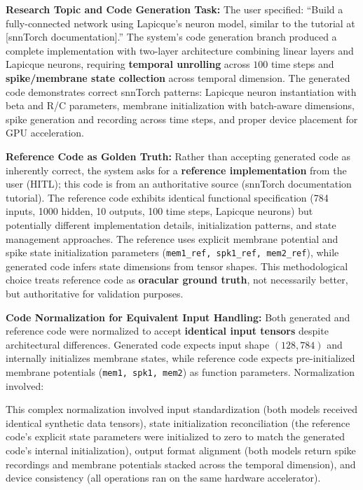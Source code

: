 \vspace{0.3cm}

\noindent \textbf{Research Topic and Code Generation Task:} The user specified: ``Build a fully-connected network using Lapicque's neuron model, similar to the tutorial at [snnTorch documentation].'' The system's code generation branch produced a complete implementation with two-layer architecture combining linear layers and Lapicque neurons, requiring \textbf{temporal unrolling} across \( 100 \) time steps and \textbf{spike/membrane state collection} across temporal dimension. The generated code demonstrates correct snnTorch patterns: Lapicque neuron instantiation with beta and R/C parameters, membrane initialization with batch-aware dimensions, spike generation and recording across time steps, and proper device placement for GPU acceleration.

\vspace{0.3cm}

\noindent \textbf{Reference Code as Golden Truth:} Rather than accepting generated code as inherently correct, the system asks for a \textbf{reference implementation} from the user (HITL); this code is from an authoritative source (snnTorch documentation tutorial). The reference code exhibits identical functional specification (784 inputs, 1000 hidden, 10 outputs, 100 time steps, Lapicque neurons) but potentially different implementation details, initialization patterns, and state management approaches. The reference uses explicit membrane potential and spike state initialization parameters (\texttt{mem1\_\allowbreak ref, spk1\_\allowbreak ref, mem2\_\allowbreak ref}), while generated code infers state dimensions from tensor shapes. This methodological choice treats reference code as \textbf{oracular ground truth}, not necessarily better, but authoritative for validation purposes.

\vspace{0.3cm}

\noindent \textbf{Code Normalization for Equivalent Input Handling:} Both generated and reference code were normalized to accept \textbf{identical input tensors} despite architectural differences. Generated code expects input shape \( (128, 784) \) and internally initializes membrane states, while reference code expects pre-initialized membrane potentials (\texttt{mem1, spk1, mem2}) as function parameters. Normalization involved:

This complex normalization involved input standardization (both models received identical synthetic data tensors), state initialization reconciliation (the reference code's explicit state parameters were initialized to zero to match the generated code's internal initialization), output format alignment (both models return spike recordings and membrane potentials stacked across the temporal dimension), and device consistency (all operations ran on the same hardware accelerator).

